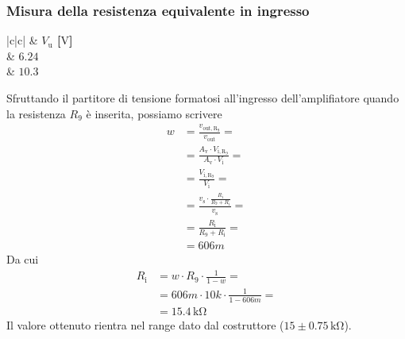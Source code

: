 \documentclass[a4paper]{article}
\begin{document}
			\subsubsection{Misura della resistenza equivalente in ingresso}
				\begin{center}
					\begin{tabular}{ |c|c| }
						\hline
						\multirow{} 						 & \textbf{$ V_{\mathrm{u}} $ [$ \mathrm{V} $]} \\
						\hline
								 & $ 6.24 $ \\
						 & $ 10.3 $ \\
						\hline
					\end{tabular}
				\end{center}
				Sfruttando il partitore di tensione formatosi all'ingresso dell'amplifiatore quando la resistenza $ R_{9} $ è inserita, possiamo scrivere
				\begin{equation*}
					\begin{split}
						w &= \frac{v_{\mathrm{out,R_{9}}}}{v_{\mathrm{out}}} = \\
						  &= \frac{A_{\mathrm{v}} \cdot V_{\mathrm{i,R_{9}}}}{A_{\mathrm{v}} \cdot V_{\mathrm{i}}} = \\
						  &= \frac{V_{\mathrm{i,R_{9}}}}{V_{\mathrm{i}}} = \\
						  &= \frac{v_{\mathrm{s}} \cdot \frac{R_{\mathrm{i}}}{R_{9} + R_{\mathrm{i}}}}{v_{\mathrm{s}}} = \\
						  &= \frac{R_{\mathrm{i}}}{R_{9} + R_{\mathrm{i}}} = \\
						  &= 606m
					\end{split}
				\end{equation*}
				Da cui
				\begin{equation*}
					\begin{split}
						R_{\mathrm{i}} &= w \cdot R_{9} \cdot \frac{1}{1 - w} = \\
									   &= 606m \cdot 10k \cdot \frac{1}{1 - 606m} = \\
									   &= 15.4 \, \mathrm{k\Omega}
					\end{split}
				\end{equation*}
				Il valore ottenuto rientra nel range dato dal costruttore ($ 15 \pm 0.75 \, \mathrm{k\Omega} $).
\end{document}
